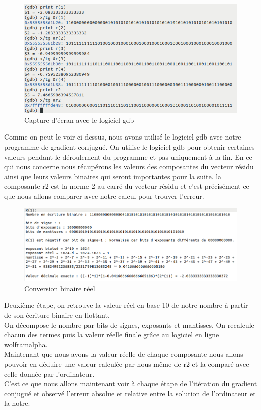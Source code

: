 \documentclass[12,french]{report}
\begin{document}
\begin{figure}[H]
	\center
	\includegraphics[width=1\textwidth]{./Images/Exemple_gdb}
	\caption{Capture d'écran avec le logiciel gdb}
\end{figure}

Comme on peut le voir ci-dessus, nous avons utilisé le logiciel gdb avec notre programme de gradient conjugué. On utilise le logiciel gdb pour obtenir certaines valeurs pendant le déroulement du programme et pas uniquement à la fin. En ce qui nous concerne nous récupérons les valeurs des composantes du vecteur résidu ainsi que leurs valeurs binaires qui seront importantes pour la suite. la composante r2 est la norme 2 au carré du vecteur résidu et c'est précisément ce que nous allons comparer avec notre calcul pour trouver l'erreur.\\

\begin{figure}[H]
	\center
	\includegraphics[width=1\textwidth]{./Images/r_0_dec}
	\caption{Conversion binaire réel}
\end{figure}

Deuxième étape, on retrouve la valeur réel en base 10 de notre nombre à partir de son écriture binaire en flottant.\\
On décompose le nombre par bits de signes, exposants et mantisses. On recalcule chacun des termes puis la valeur réelle finale grâce au logiciel en ligne wolframalpha. \\
Maintenant que nous avons la valeur réelle de chaque composante nous allons pouvoir en déduire une valeur calculée par nous même de r2 et la comparé avec celle donnée par l'ordinateur.\\
C'est ce que nous allons maintenant voir à chaque étape de l'itération du gradient conjugué et observé l'erreur absolue et relative entre la solution de l'ordinateur et la notre.
\end{document}
